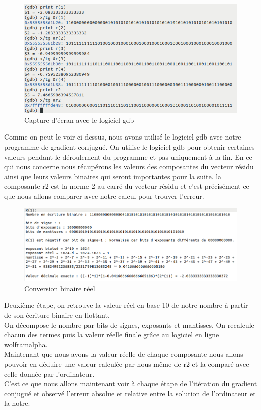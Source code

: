 \documentclass[12,french]{report}
\begin{document}
\begin{figure}[H]
	\center
	\includegraphics[width=1\textwidth]{./Images/Exemple_gdb}
	\caption{Capture d'écran avec le logiciel gdb}
\end{figure}

Comme on peut le voir ci-dessus, nous avons utilisé le logiciel gdb avec notre programme de gradient conjugué. On utilise le logiciel gdb pour obtenir certaines valeurs pendant le déroulement du programme et pas uniquement à la fin. En ce qui nous concerne nous récupérons les valeurs des composantes du vecteur résidu ainsi que leurs valeurs binaires qui seront importantes pour la suite. la composante r2 est la norme 2 au carré du vecteur résidu et c'est précisément ce que nous allons comparer avec notre calcul pour trouver l'erreur.\\

\begin{figure}[H]
	\center
	\includegraphics[width=1\textwidth]{./Images/r_0_dec}
	\caption{Conversion binaire réel}
\end{figure}

Deuxième étape, on retrouve la valeur réel en base 10 de notre nombre à partir de son écriture binaire en flottant.\\
On décompose le nombre par bits de signes, exposants et mantisses. On recalcule chacun des termes puis la valeur réelle finale grâce au logiciel en ligne wolframalpha. \\
Maintenant que nous avons la valeur réelle de chaque composante nous allons pouvoir en déduire une valeur calculée par nous même de r2 et la comparé avec celle donnée par l'ordinateur.\\
C'est ce que nous allons maintenant voir à chaque étape de l'itération du gradient conjugué et observé l'erreur absolue et relative entre la solution de l'ordinateur et la notre.
\end{document}
